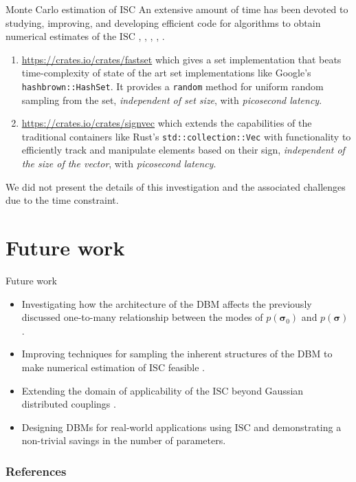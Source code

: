\documentclass[8pt]{beamer}
\begin{document}
\begin{frame}[label={sec:org48e3676},fragile]{Monte Carlo estimation of ISC}
An extensive amount of time has been devoted to studying, improving, and developing efficient code for algorithms to obtain numerical estimates of the \(\mathrm{ISC}\) \cite{schnabel2017dynamic}, \cite{waclaw2008counting}, \cite{schnabel2018distribution}, \cite{schnabel2019distribution}, \cite{schnabel2020counting}.
\linebreak
\begin{enumerate}
\item \alert{\url{https://crates.io/crates/fastset}} which gives a set implementation that beats time-complexity of state of the art set implementations like Google's \texttt{hashbrown::HashSet}. It provides a \texttt{random} method for uniform random sampling from the set, \emph{independent of set size}, with \emph{picosecond latency}.
\linebreak
\item \alert{\url{https://crates.io/crates/signvec}} which extends the capabilities of the traditional containers like Rust's \texttt{std::collection::Vec} with functionality to efficiently track and manipulate elements based on their sign, \emph{independent of the size of the vector}, with \emph{picosecond latency}.
\linebreak
\end{enumerate}
We did not present the details of this investigation and the associated challenges due to the time constraint.
\end{frame}

\section{Future work}
\label{sec:org1bc37d5}
\begin{frame}[label={sec:org2d79253}]{Future work}
\begin{itemize}
\item Investigating how the architecture of the DBM affects the previously discussed one-to-many relationship between the modes of \(p(\boldsymbol{\sigma}_{0})\) and \(p(\boldsymbol{\sigma})\) \cite{montufar2015mixture}.
\linebreak
\item Improving techniques for sampling the inherent structures of the DBM to make numerical estimation of \(\mathrm{ISC}\) feasible \cite{schnabel2019distribution}.
\linebreak
\item Extending the domain of applicability of the \(\mathrm{ISC}\) beyond Gaussian distributed couplings \cite{ichikawa2022statistical}.
\linebreak
\item Designing DBMs for real-world applications using \(\mathrm{ISC}\) and demonstrating a non-trivial savings in the number of parameters.
\end{itemize}
\end{frame}

\begin{frame}[allowframebreaks]
\frametitle{References}
\printbibliography
\end{frame}
\end{document}

